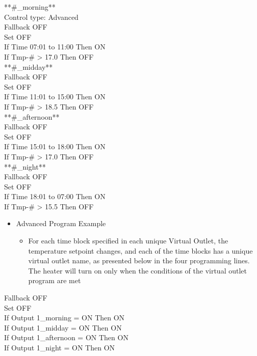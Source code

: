 \documentclass[
]{book}
\providecommand{\tightlist}{%
  \setlength{\itemsep}{0pt}\setlength{\parskip}{0pt}}
\begin{document}
\begin{itemize}
  **\#\_morning**\\
  Control type: Advanced\\
  Fallback OFF\\
  Set OFF\\
  If Time 07:01 to 11:00 Then ON\\
  If Tmp-\# \textgreater{} 17.0 Then OFF\\
  **\#\_midday**\\
  Fallback OFF\\
  Set OFF\\
  If Time 11:01 to 15:00 Then ON\\
  If Tmp-\# \textgreater{} 18.5 Then OFF\\
  **\#\_afternoon**\\
  Fallback OFF\\
  Set OFF\\
  If Time 15:01 to 18:00 Then ON\\
  If Tmp-\# \textgreater{} 17.0 Then OFF\\
  **\#\_night**\\
  Fallback OFF\\
  Set OFF\\
  If Time 18:01 to 07:00 Then ON\\
  If Tmp-\# \textgreater{} 15.5 Then OFF

  \begin{itemize}
  \tightlist
  \item
    Advanced Program Example

    \begin{itemize}
    \tightlist
    \item
      For each time block specified in each unique Virtual Outlet, the temperature setpoint changes, and each of the time blocks has a unique virtual outlet name, as presented below in the four programming lines. The heater will turn on only when the conditions of the virtual outlet program are met
    \end{itemize}
  \end{itemize}

  Fallback OFF\\
  Set OFF\\
  If Output 1\_morning = ON Then ON\\
  If Output 1\_midday = ON Then ON\\
  If Output 1\_afternoon = ON Then ON\\
  If Output 1\_night = ON Then ON
\end{itemize}
\end{document}
